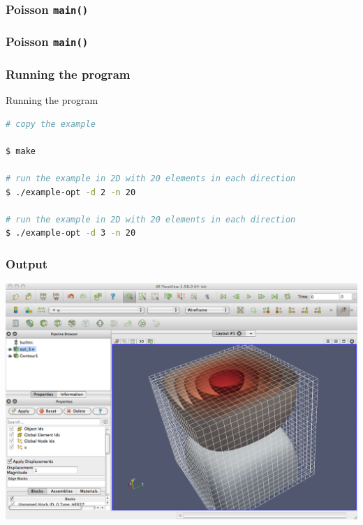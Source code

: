 \begin{frame}[allowframebreaks]
  \frametitle{Poisson \texttt{main()}}
  
\end{frame}


\begin{frame}[allowframebreaks]
  \frametitle{Poisson \texttt{main()}}
  
\end{frame}


\begin{frame}[fragile]
  \frametitle{Running the program}
    \begin{block}{Running the program}
    \begin{lstlisting}[language=bash]
# copy the example

$ make

# run the example in 2D with 20 elements in each direction
$ ./example-opt -d 2 -n 20 

# run the example in 2D with 20 elements in each direction
$ ./example-opt -d 3 -n 20 
    \end{lstlisting}
  \end{block}
\end{frame}

\frame
{
  \frametitle{Output}
  \begin{center}
    \includegraphics[height=0.8\textheight]{tutorial/poisson_ex1/screen}
  \end{center}
} 

\frame
{
  \Large
  \begin{block}{}
  \end{block}
}



